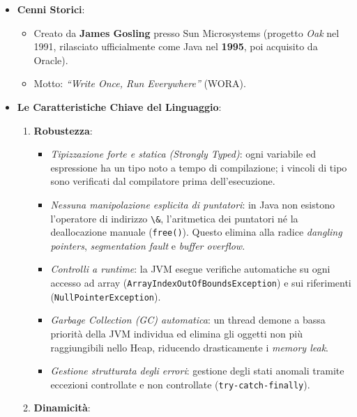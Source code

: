 \documentclass[11pt,a4paper]{article}
\newcommand{\passthrough}[1]{#1}
\providecommand{\tightlist}{\setlength{\itemsep}{0pt}\setlength{\parskip}{0pt}}
\begin{document}
\begin{itemize}
\tightlist
\item
  \textbf{Cenni Storici}:

  \begin{itemize}
  \tightlist
  \item
    Creato da \textbf{James Gosling} presso Sun Microsystems (progetto
    \emph{Oak} nel 1991, rilasciato ufficialmente come Java nel
    \textbf{1995}, poi acquisito da Oracle).
  \item
    Motto: \emph{``Write Once, Run Everywhere''} (WORA).
  \end{itemize}
\item
  \textbf{Le Caratteristiche Chiave del Linguaggio}:

  \begin{enumerate}
  \def\labelenumi{\arabic{enumi}.}
  \tightlist
  \item
    \textbf{Robustezza}:

    \begin{itemize}
    \tightlist
    \item
      \emph{Tipizzazione forte e statica (Strongly Typed)}: ogni
      variabile ed espressione ha un tipo noto a tempo di compilazione;
      i vincoli di tipo sono verificati dal compilatore prima
      dell'esecuzione.
    \item
      \emph{Nessuna manipolazione esplicita di puntatori}: in Java non
      esistono l'operatore di indirizzo \passthrough{\lstinline!\&!},
      l'aritmetica dei puntatori né la deallocazione manuale
      (\passthrough{\lstinline!free()!}). Questo elimina alla radice
      \emph{dangling pointers}, \emph{segmentation fault} e \emph{buffer
      overflow}.
    \item
      \emph{Controlli a runtime}: la JVM esegue verifiche automatiche su
      ogni accesso ad array
      (\passthrough{\lstinline!ArrayIndexOutOfBoundsException!}) e sui
      riferimenti (\passthrough{\lstinline!NullPointerException!}).
    \item
      \emph{Garbage Collection (GC) automatica}: un thread demone a
      bassa priorità della JVM individua ed elimina gli oggetti non più
      raggiungibili nello Heap, riducendo drasticamente i \emph{memory
      leak}.
    \item
      \emph{Gestione strutturata degli errori}: gestione degli stati
      anomali tramite eccezioni controllate e non controllate
      (\passthrough{\lstinline!try-catch-finally!}).
    \end{itemize}
  \item
    \textbf{Dinamicità}:


\end{enumerate}
\end{itemize}
\end{document}
